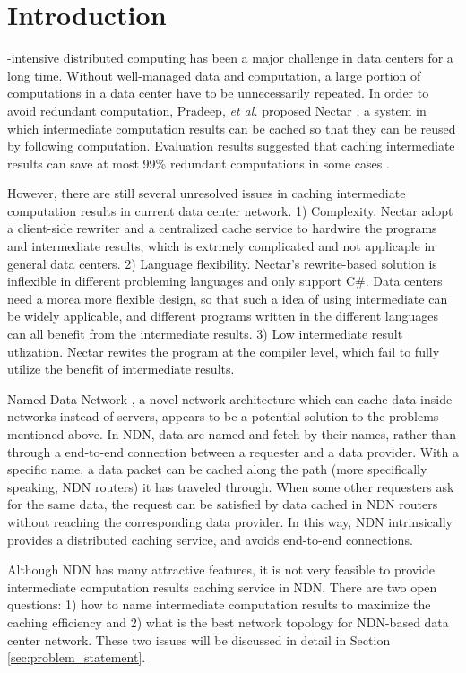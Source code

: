 \section{Introduction}
-intensive distributed computing has been a major challenge
in data centers for a long time.  Without well-managed data and computation, a
large portion of computations in a data center have to be unnecessarily
repeated.  In order to avoid redundant computation, Pradeep, {\it et al.}
proposed Nectar \cite{gunda2010nectar}, a system in which intermediate computation
results can be cached so that they can be reused by following computation.
Evaluation results suggested that caching intermediate results can save at most
99\% redundant computations in some cases \cite{gunda2010nectar}.

However, there are still several unresolved issues in caching intermediate
computation results in current data center network.  1) Complexity. Nectar adopt a client-side rewriter and a centralized cache service to hardwire the programs and intermediate results, which is extrmely complicated and not applicaple in general data centers. 2) Language flexibility. Nectar's rewrite-based solution is inflexible in different probleming languages and only support C\#. 
Data centers need a morea more flexible design, so that such a idea of using intermediate can be widely applicable, and different programs written in the different
languages can all benefit from the intermediate results. 3) Low intermediate result utlization. Nectar rewites the program at the compiler level, which fail to fully utilize the benefit of intermediate results.

Named-Data Network \cite{jacobson2009networking}, a novel network architecture
which can cache data inside networks instead of servers, appears to be a
potential solution to the problems mentioned above.  In NDN, data are named and
fetch by their names, rather than through a end-to-end connection between a
requester and a data provider.  With a specific name, a data packet can be
cached along the path (more specifically speaking, NDN routers) it has traveled
through.  When some other requesters ask for the same data, the request can be
satisfied by data cached in NDN routers without reaching the corresponding data
provider.  In this way, NDN intrinsically provides a distributed caching
service, and avoids end-to-end connections. 

Although NDN has many attractive features, it is not very feasible to provide
intermediate computation results caching service in NDN.  There are two open
questions: 1) how to name intermediate computation results to maximize the
caching efficiency and 2) what is the best network topology for NDN-based data
center network.  These two issues will be discussed in detail in Section
\ref{sec:problem_statement}.

